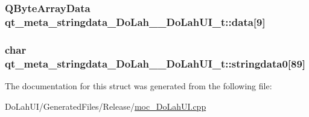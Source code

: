 \subsubsection[{data}]{\setlength{\rightskip}{0pt plus 5cm}Q\+Byte\+Array\+Data qt\+\_\+meta\+\_\+stringdata\+\_\+\+Do\+Lah\+\_\+\+\_\+\+Do\+Lah\+U\+I\+\_\+t\+::data\mbox{[}9\mbox{]}}\label{structqt__meta__stringdata___do_lah_____do_lah_u_i__t_a4e53868f0a83dd2ef7991c39f77db48f}
\hypertarget{structqt__meta__stringdata___do_lah_____do_lah_u_i__t_ab8944e890bd534b11f586f8bd00b4e03}{}
\subsubsection[{stringdata0}]{\setlength{\rightskip}{0pt plus 5cm}char qt\+\_\+meta\+\_\+stringdata\+\_\+\+Do\+Lah\+\_\+\+\_\+\+Do\+Lah\+U\+I\+\_\+t\+::stringdata0\mbox{[}89\mbox{]}}\label{structqt__meta__stringdata___do_lah_____do_lah_u_i__t_ab8944e890bd534b11f586f8bd00b4e03}


The documentation for this struct was generated from the following file\+:\begin{DoxyCompactItemize}
\item 
Do\+Lah\+U\+I/\+Generated\+Files/\+Release/\hyperlink{moc___do_lah_u_i_8cpp}{moc\+\_\+\+Do\+Lah\+U\+I.\+cpp}\end{DoxyCompactItemize}
